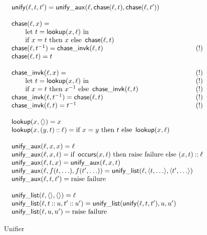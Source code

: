 \documentclass[12pt]{article}
\theoremstyle{definition}
\begin{document}
\begin{figure}
$$
\begin{array}{l}
\cn{unify}(\ell, t, t') = \cn{unify\_aux}(\ell,\cn{chase}(\ell, t),
\cn{chase}(\ell, t'))
\\
\\\cn{chase}(\ell, x)=
\\ \qquad\mbox{let }t=\cn{lookup}(x,\ell)\mbox{ in}
\\ \qquad \mbox{if }x = t\mbox{ then }x
\mbox{ else }\cn{chase}(\ell, t)
\\\cn{chase}(\ell, t^{-1})=\cn{chase\_invk}(\ell, t)\hfill(!)
\\\cn{chase}(\ell, t)=t
\\
\\\cn{chase\_invk}(\ell, x)=\hfill(!)
\\ \qquad\mbox{let }t=\cn{lookup}(x,\ell)\mbox{ in}\hfill(!)
\\ \qquad \mbox{if }x = t\mbox{ then }x^{-1}
\mbox{ else }\cn{chase\_invk}(\ell, t)\hfill(!)
\\\cn{chase\_invk}(\ell, t^{-1})=\cn{chase}(\ell, t)\hfill(!)
\\\cn{chase\_invk}(\ell, t)=t^{-1}\hfill(!)
\\
\\\cn{lookup}(x,\seq{})=x
\\\cn{lookup}(x,(y,t)\cons\ell)=
\mbox{if }x=y\mbox{ then }t\mbox{ else }
\cn{lookup}(x, \ell)
\\
\\\cn{unify\_aux}(\ell,x,x) =\ell
\\\cn{unify\_aux}(\ell,x,t) =\mbox{if }\cn{occurs}(x, t)\mbox{ then raise failure else }
(x,t)\cons\ell
\\\cn{unify\_aux}(\ell,t,x) =\cn{unify\_aux}(\ell,x,t)
\\\cn{unify\_aux}(\ell,f(t,\ldots),f(t',\ldots)) =
\cn{unify\_list}(\ell,\seq{t,\ldots},\seq{t',\ldots})
\\\cn{unify\_aux}(\ell,t,t') =\mbox{raise failure}
\\
\\\cn{unify\_list}(\ell,\seq{},\seq{}) =\ell
\\\cn{unify\_list}(\ell,t\cons u,t'\cons u') =
\cn{unify\_list}(\cn{unify}(\ell,t,t'), u, u')
\\\cn{unify\_list}(\ell,u,u') =\mbox{raise failure}
\end{array}
$$
\caption{Unifier}\label{fig:unifier}
\end{figure}
\end{document}
